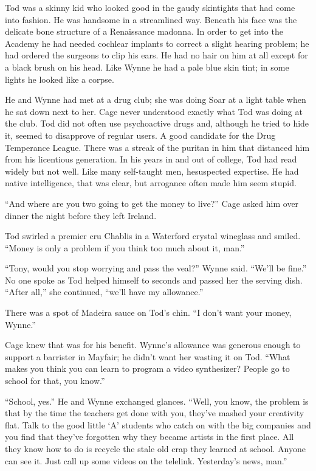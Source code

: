 Tod was a skinny kid who looked good in the gaudy skintights that had come into fashion. He was handsome in a streamlined way. Beneath his face was the delicate bone structure of a Renaissance madonna. In order to get into the Academy he had needed cochlear implants to correct a slight hearing problem; he had ordered the surgeons to clip his ears. He had no hair on him at all except for a black brush on his head. Like Wynne he had a pale blue skin tint; in some lights he looked like a corpse.

He and Wynne had met at a drug club; she was doing Soar at a light table when he sat down next to her. Cage never understood exactly what Tod was doing at the club. Tod did not often use psychoactive drugs and, although he tried to hide it, seemed to disapprove of regular users. A good candidate for the Drug Temperance League. There was a streak of the puritan in him that distanced him from his licentious generation. In his years in and out of college, Tod had read widely but not well. Like many self-taught men, hesuspected expertise. He had native intelligence, that was clear, but arrogance often made him seem stupid.

``And where are you two going to get the money to live?'' Cage asked him over dinner the night before they left Ireland.

Tod swirled a premier cru Chablis in a Waterford crystal wineglass and smiled. ``Money is only a problem if you think too much about it, man.''

``Tony, would you stop worrying and pass the veal?'' Wynne said. ``We'll be fine.'' No one spoke as Tod helped himself to seconds and passed her the serving dish. ``After all,'' she continued, ``we'll have my allowance.''

There was a spot of Madeira sauce on Tod's chin. ``I don't want your money, Wynne.''

Cage knew that was for his benefit. Wynne's allowance was generous enough to support a barrister in Mayfair; he didn't want her wasting it on Tod. ``What makes you think you can learn to program a video synthesizer? People go to school for that, you know.''

``School, yes.'' He and Wynne exchanged glances. ``Well, you know, the problem is that by the time the teachers get done with you, they've mashed your creativity flat. Talk to the good little `A' students who catch on with the big companies and you find that they've forgotten why they became artists in the first place. All they know how to do is recycle the stale old crap they learned at school. Anyone can see it. Just call up some videos on the telelink. Yesterday's news, man.''

